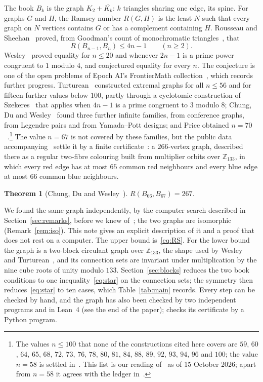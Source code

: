 \documentclass[11pt]{amsart}
\newtheorem*{maintheorem}{Theorem}
\theoremstyle{definition}
\theoremstyle{remark}
\numberwithin{equation}{section}
\newcommand{\Z}{\mathbb{Z}}
\begin{document}
The book $B_k$ is the graph $K_2+\overline{K_k}$: $k$ triangles sharing one edge, its spine. For graphs $G$ and $H$, the Ramsey number $R(G,H)$ is the least $N$ such that every graph on $N$ vertices contains $G$ or has a complement containing $H$. Rousseau and Sheehan~\cite{RS} proved, from Goodman's count of monochromatic triangles~\cite{Go}, that
\begin{equation}\label{eq:RS}
R(B_{n-1},B_n)\le 4n-1\qquad(n\ge2).
\end{equation}
Wesley~\cite{We} proved equality for $n\le20$ and whenever $2n-1$ is a prime power congruent to $1$ modulo $4$, and conjectured equality for every $n$. The conjecture is one of the open problems of Epoch AI's FrontierMath collection~\cite{Ep}, which records further progress. Turturean~\cite{Tu} constructed extremal graphs for all $n\le56$ and for fifteen further values below $100$, partly through a cyclotomic construction of Szekeres~\cite{Sz} that applies when $4n-1$ is a prime congruent to $3$ modulo $8$; Chung, Du and Wesley~\cite{CDW} found three further infinite families, from conference graphs, from Legendre pairs and from Yamada--Pott designs; and Price obtained $n=70$~\cite{Ep}.\footnote{The values $n\le100$ that none of the constructions cited here covers are $59$, $60$, $64$, $65$, $68$, $72$, $73$, $76$, $78$, $80$, $81$, $84$, $88$, $89$, $92$, $93$, $94$, $96$ and $100$; the value $n=58$ is settled in~\cite{Bh58}. This list is our reading of~\cite{CDW,CDWd,Ep,Tu,We} as of 15 October 2026; apart from $n=58$ it agrees with the ledger in~\cite[Section~6.1]{CDWd}.} The value $n=67$ is not covered by these families, but the public data accompanying~\cite{CDW} settle it by a finite certificate~\cite[Section~5.1]{CDWd}: a $266$-vertex graph, described there as a regular two-fibre colouring built from multiplier orbits over $\Z_{133}$, in which every red edge has at most $65$ common red neighbours and every blue edge at most $66$ common blue neighbours.

\begin{maintheorem}[Chung, Du and Wesley~\cite{CDWd}]
$R(B_{66},B_{67})=267$.
\end{maintheorem}

We found the same graph independently, by the computer search described in Section~\ref{sec:remarks}, before we knew of~\cite{CDWd}; the two graphs are isomorphic (Remark~\ref{rem:iso}). This note gives an explicit description of it and a proof that does not rest on a computer. The upper bound is~\eqref{eq:RS}. For the lower bound the graph is a two-block circulant graph over $\Z_{133}$, the shape used by Wesley~\cite{We} and Turturean~\cite{Tu}, and its connection sets are invariant under multiplication by the nine cube roots of unity modulo $133$. Section~\ref{sec:blocks} reduces the two book conditions to one inequality~\eqref{eq:star} on the connection sets; the symmetry then reduces~\eqref{eq:star} to ten cases, which Table~\ref{tab:main} records. Every step can be checked by hand, and the graph has also been checked by two independent programs and in Lean~4 (see the end of the paper); \cite{CDWd} checks its certificate by a Python program.
\end{document}
